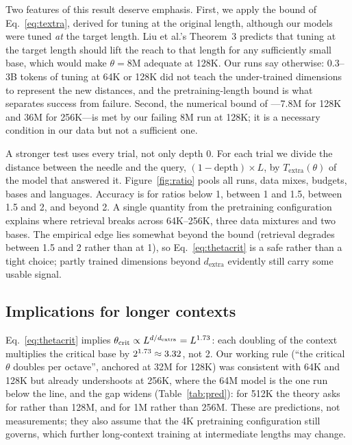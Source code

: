 \documentclass[11pt]{article}
\begin{document}
Two features of this result deserve emphasis. First, we apply the bound of Eq.~\ref{eq:textra}, derived for tuning at the original length, although our models were tuned \emph{at} the target length. Liu et al.'s Theorem~3 predicts that tuning at the target length should lift the reach to that length for any sufficiently small base, which would make $\theta=8$M adequate at 128K. Our runs say otherwise: 0.3--3B tokens of tuning at 64K or 128K did not teach the under-trained dimensions to represent the new distances, and the pretraining-length bound is what separates success from failure. Second, the numerical bound of \citet{men2024base}---7.8M for 128K and 36M for 256K---is met by our failing 8M run at 128K; it is a necessary condition in our data but not a sufficient one.

A stronger test uses every trial, not only depth 0. For each trial we divide the distance between the needle and the query, $(1-\text{depth})\times L$, by $T_{\mathrm{extra}}(\theta)$ of the model that answered it. Figure~\ref{fig:ratio} pools all runs, data mixes, budgets, bases and languages. Accuracy is \ratioBelowOne{} for ratios below 1, \ratioOneToOneHalf{} between 1 and 1.5, \ratioOneHalfToTwo{} between 1.5 and 2, and \ratioAboveTwo{} beyond 2. A single quantity from the pretraining configuration explains where retrieval breaks across 64K--256K, three data mixtures and two bases. The empirical edge lies somewhat beyond the bound (retrieval degrades between 1.5 and 2 rather than at 1), so Eq.~\ref{eq:thetacrit} is a safe rather than a tight choice; partly trained dimensions beyond $d_{\mathrm{extra}}$ evidently still carry some usable signal.

\subsection{Implications for longer contexts}
\label{sec:predictions}
Eq.~\ref{eq:thetacrit} implies $\theta_{\mathrm{crit}}\propto L^{d/d_{\mathrm{extra}}}=L^{1.73}$: each doubling of the context multiplies the critical base by $2^{1.73}\approx3.32$, not 2. Our working rule (``the critical $\theta$ doubles per octave'', anchored at 32M for 128K) was consistent with 64K and 128K but already undershoots at 256K, where the 64M model is the one run below the line, and the gap widens (Table~\ref{tab:pred}): for 512K the theory asks for \thetaCritFiveTwelve{} rather than 128M, and for 1M \thetaCritOneM{} rather than 256M. These are predictions, not measurements; they also assume that the 4K pretraining configuration still governs, which further long-context training at intermediate lengths may change.
\end{document}
